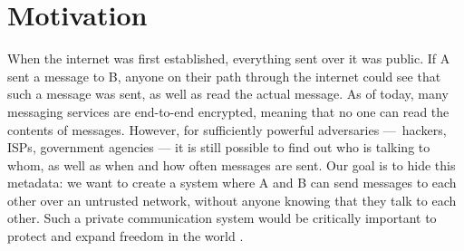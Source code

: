 
\section{Motivation}

When the internet was first established, everything sent over it was public. 
If A sent a message to B, anyone on their path through the internet could see that such a message was sent, as well as read the actual message. As of today, many messaging services are end-to-end encrypted, meaning that no one can read the contents of messages. However, for sufficiently powerful adversaries — hackers, ISPs, government agencies — it is still possible to find out who is talking to whom, as well as when and how often messages are sent. Our goal is to hide this metadata: we want to create a system where A and B can send messages to each other over an untrusted network, without anyone knowing that they talk to each other. Such a private communication system would be critically important to protect and expand freedom in the world \cite{arvid}.
